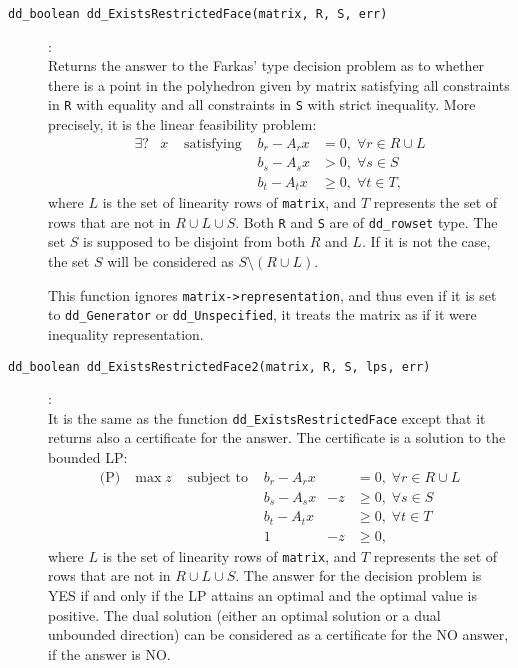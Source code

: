 \documentclass[11pt]{article}
\newcommand {\0} {{\bf 0}}
\begin{document}
\begin{description}
\item[{\tt dd\_boolean dd\_ExistsRestrictedFace(matrix, R, S, err)}]:\\
Returns the answer to the Farkas' type decision problem as to whether there is a point
in the polyhedron given by matrix satisfying all constraints in {\tt R} with
equality and all constraints in {\tt S} with strict inequality.  More precisely,
it is the linear feasibility problem:
\[
\begin{array}{llllll}
\exists\mbox{?} &x  &\mbox{ satisfying } & b_r - A_r x  &= 0, \; \forall r \in R\cup L \\
                &   &                    & b_s - A_s x  &> 0, \; \forall s \in S \\
                &   &                    & b_t - A_t x  &\ge 0, \; \forall t \in T,
\end{array}
\]
where $L$ is the set of linearity rows of {\tt matrix}, and $T$ represents
the set of rows that are not in $R\cup L \cup S$.
Both {\tt R} and {\tt S} are of {\tt dd\_rowset} type.  The set $S$ is
supposed to be disjoint from both $R$ and $L$.
If it is not the case, the set $S$ will be considered as $S \setminus (R \cup L)$.

This function ignores {\tt matrix->representation}, and thus even if it is
set to {\tt dd\_Generator} or {\tt dd\_Unspecified}, it treats the matrix
as if it were inequality representation.

\item[{\tt dd\_boolean dd\_ExistsRestrictedFace2(matrix, R, S, lps, err)}]:\\
It is the same as the function {\tt dd\_ExistsRestrictedFace} except that
it returns also a certificate for the answer.  The certificate is a solution
to the bounded LP: 
\[
\begin{array}{lllllll}
\mbox{(P)} &\max  z  &\mbox{ subject to } & b_r - A_r x  &   & = 0, \; \forall r \in R\cup L \\
           &         &                    & b_s - A_s x  &-z &\ge 0, \;  \forall s \in S \\
          &         &                    & b_t - A_t x   &   &\ge 0, \; \forall t \in T \\
         &         &                    & 1              & -z&\ge 0,
\end{array}
\]
where $L$ is the set of linearity rows of {\tt matrix}, and $T$ represents
the set of rows that are not in $R\cup L \cup S$.
The answer for the decision problem is YES if and only if the LP attains 
an optimal and the optimal value is positive.  The dual solution (either
an optimal solution or a dual unbounded direction) can be considered
as a certificate for the NO answer, if the answer is NO.


\end{description}
\end{document}
